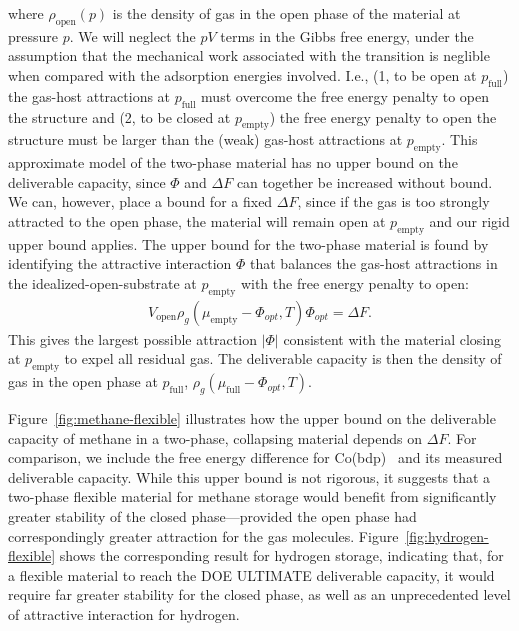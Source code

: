 \documentclass[twoside,twocolumn,9pt]{article}
\newcommand\V{\Phi}
\newcommand\pfull{\ensuremath{p_{\text{full}}}}
\newcommand\pempty{\ensuremath{p_{\text{empty}}}}
\newcommand\mufull{\ensuremath{\mu_{\text{full}}}}
\newcommand\muempty{\ensuremath{\mu_{\text{empty}}}}
\begin{document}
where $\rho_{\text{open}}(p)$ is the density of gas
in the open phase of the material at pressure $p$. We will neglect the $pV$
terms in the Gibbs free energy, under the assumption that the mechanical
work associated with the transition is neglible when compared with the
adsorption energies involved.
I.e., (1, to be open at $\pfull$) the gas-host attractions at $\pfull$ must overcome the free energy penalty to open the structure and 
(2, to be closed at $\pempty$) the free energy penalty to open the structure must be larger than the (weak) gas-host attractions at $\pempty$.
This approximate model of the two-phase material has no upper bound on the deliverable capacity, since
$\V$ and $\Delta F$ can together be increased without bound.
We can, however, place a bound for a fixed $\Delta F$, since if the gas is too strongly attracted to the open phase,
the material will remain open at $\pempty$ and our rigid upper bound applies.
The upper bound for the two-phase material is found by identifying the
attractive interaction $\V$ that balances the gas-host attractions in the idealized-open-substrate at $\pempty$ with the free energy penalty to open:
\begin{align}
    V_{\text{open}} \rho_g(\muempty{} - \V_{opt}, T)\V_{opt} = \Delta F.
\end{align}
This gives the largest possible attraction $|\V|$ consistent with the material closing
at $\pempty$ to expel all residual gas. 
The deliverable capacity is then the density of gas in the open phase at $\pfull$, $\rho_g(\mufull{} - \V_{opt}, T)$.

Figure~\ref{fig:methane-flexible} illustrates
how the upper bound on the deliverable capacity of methane in a two-phase,
collapsing material depends on $\Delta F$. 
For comparison, we include the free energy
difference for Co(bdp)~\cite{choi2008broadly} and its measured deliverable capacity.  
While this upper bound is not rigorous, it suggests that a two-phase flexible material for methane storage
would benefit from significantly greater stability of the closed phase---provided the open phase
had correspondingly greater attraction for the gas molecules.  Figure~\ref{fig:hydrogen-flexible}
shows the corresponding result for hydrogen storage, indicating that, for a flexible material to
reach the DOE ULTIMATE deliverable capacity, it would require far greater stability for the closed
phase, as well as an unprecedented level of attractive interaction for hydrogen.
\end{document}
